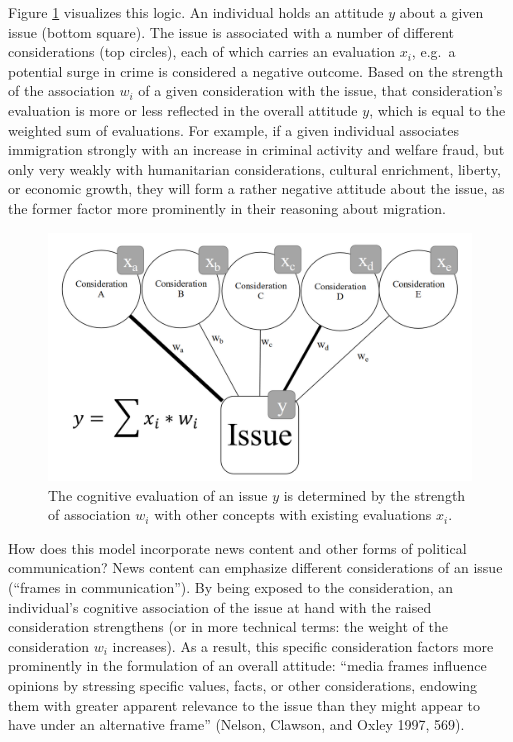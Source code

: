\documentclass[
  12pt,
]{article}
\begin{document}
Figure \ref{fig:cogStor} visualizes this logic. An individual holds an attitude \(y\) about a given issue (bottom square). The issue is associated with a number of different considerations (top circles), each of which carries an evaluation \(x_i\), e.g.~a potential surge in crime is considered a negative outcome. Based on the strength of the association \(w_i\) of a given consideration with the issue, that consideration's evaluation is more or less reflected in the overall attitude \(y\), which is equal to the weighted sum of evaluations. For example, if a given individual associates immigration strongly with an increase in criminal activity and welfare fraud, but only very weakly with humanitarian considerations, cultural enrichment, liberty, or economic growth, they will form a rather negative attitude about the issue, as the former factor more prominently in their reasoning about migration.

\begin{figure}
    \centering
    \includegraphics[width=\textwidth]{vis/CognitiveStorage.png}
    \caption{The cognitive evaluation of an issue $y$ is determined by the strength of association $w_i$ with other concepts with existing evaluations $x_i$.}
    \label{fig:cogStor}
\end{figure}

How does this model incorporate news content and other forms of political communication? News content can emphasize different considerations of an issue (``frames in communication''). By being exposed to the consideration, an individual's cognitive association of the issue at hand with the raised consideration strengthens (or in more technical terms: the weight of the consideration \(w_i\) increases). As a result, this specific consideration factors more prominently in the formulation of an overall attitude: ``media frames influence opinions by stressing specific values, facts, or other considerations, endowing them with greater apparent relevance to the issue than they might appear to have under an alternative frame'' (Nelson, Clawson, and Oxley 1997, 569).
\end{document}
